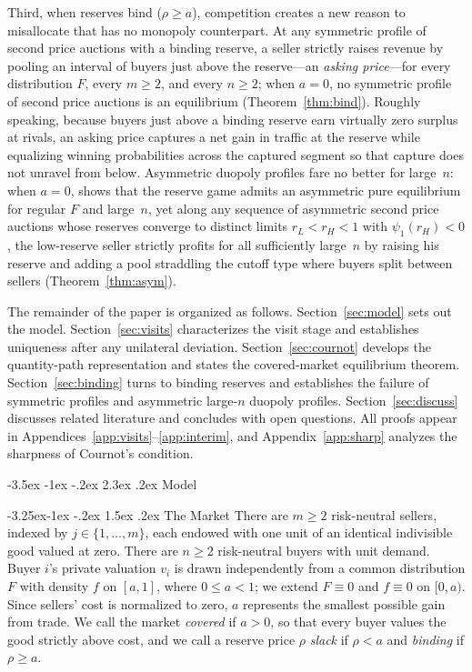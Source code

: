 \documentclass[12pt]{article}
\makeatletter
\newcommand{\citeasnoun}[1]{\citet{#1}}
\theoremstyle{mystyle}
\theoremstyle{mystyle2}
\newcommand{\mmpfont}{\scshape}
\renewcommand\section{\@startsection {section}{1}{\z@}%
                                   {-3.5ex \@plus -1ex \@minus -.2ex}%
                                   {2.3ex \@plus .2ex}%
                                   {\normalfont\large\mmpfont}}
\renewcommand\subsection{\@startsection{subsection}{2}{\z@}%
                                     {-3.25ex\@plus -1ex \@minus -.2ex}%
                                     {1.5ex \@plus .2ex}%
                                     {\normalfont\normalsize\mmpfont}}
\newcommand{\1}{\mathbf{1}}
\makeatother
\begin{document}
Third, when reserves bind ($\rho\ge a$), competition creates a new reason to misallocate that has no monopoly counterpart. At any symmetric profile of second price auctions with a binding reserve, a seller strictly raises revenue by pooling an interval of buyers just above the reserve---an \emph{asking price}---for every distribution $F$, every $m\ge 2$, and every $n\ge 2$; when $a=0$, no symmetric profile of second price auctions is an equilibrium (Theorem~\ref{thm:bind}). Roughly speaking, because buyers just above a binding reserve earn virtually zero surplus at rivals, an asking price captures a net gain in traffic at the reserve while equalizing winning probabilities across the captured segment so that capture does not unravel from below. Asymmetric duopoly profiles fare no better for large~$n$: when $a=0$, \citeasnoun{he2026} shows that the reserve game admits an asymmetric pure equilibrium for regular $F$ and large~$n$, yet along any sequence of asymmetric second price auctions whose reserves converge to distinct limits $r_L<r_H<1$ with $\psi_1(r_H)<0$, the low-reserve seller strictly profits for all sufficiently large~$n$ by raising his reserve and adding a pool straddling the cutoff type where buyers split between sellers (Theorem~\ref{thm:asym}).

The remainder of the paper is organized as follows. Section~\ref{sec:model} sets out the model. Section~\ref{sec:visits} characterizes the visit stage and establishes uniqueness after any unilateral deviation. Section~\ref{sec:cournot} develops the quantity-path representation and states the covered-market equilibrium theorem. Section~\ref{sec:binding} turns to binding reserves and establishes the failure of symmetric profiles and asymmetric large-$n$ duopoly profiles. Section~\ref{sec:discuss} discusses related literature and concludes with open questions. All proofs appear in Appendices~\ref{app:visits}--\ref{app:interim}, and Appendix~\ref{app:sharp} analyzes the sharpness of Cournot's condition.

\section{Model} \label{sec:model}

\subsection{The Market}
There are $m\ge 2$ risk-neutral sellers, indexed by $j\in\{1,\dots,m\}$, each endowed with one unit of an identical indivisible good valued at zero. There are $n\ge 2$ risk-neutral buyers with unit demand. Buyer $i$'s private valuation $v_i$ is drawn independently from a common distribution $F$ with density $f$ on $[a,1]$, where $0\le a<1$; we extend $F\equiv 0$ and $f\equiv 0$ on $[0,a)$. Since sellers' cost is normalized to zero, $a$ represents the smallest possible gain from trade. We call the market \emph{covered} if $a>0$, so that every buyer values the good strictly above cost, and we call a reserve price $\rho$ \emph{slack} if $\rho<a$ and \emph{binding} if $\rho\ge a$.
\end{document}
